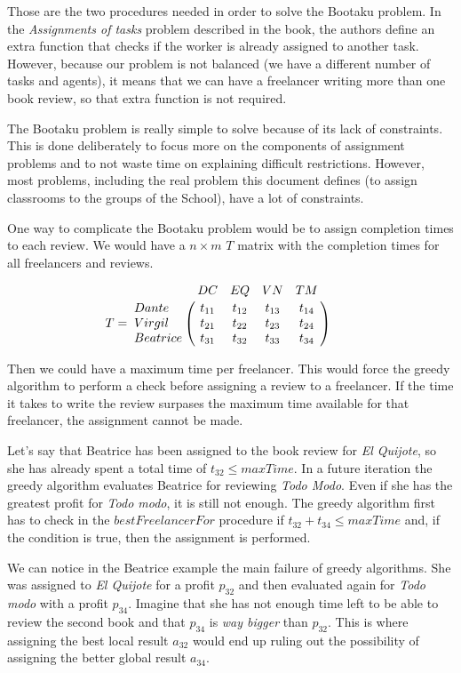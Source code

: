 Those are the two procedures needed in order to solve the Bootaku problem. In the \textit{Assignments of tasks} problem described in the book, the authors define an extra function that checks if the worker is already assigned to another task. However, because our problem is not balanced (we have a different number of tasks and agents), it means that we can have a freelancer writing more than one book review, so that extra function is not required.

The Bootaku problem is really simple to solve because of its lack of constraints. This is done deliberately to focus more on the components of assignment problems and to not waste time on explaining difficult restrictions. However, most problems, including the real problem this document defines (to assign classrooms to the groups of the School), have a lot of constraints. 

One way to complicate the Bootaku problem would be to assign completion times to each review. We would have a $n \times m$ $T$ matrix with the completion times for all freelancers and reviews.

\begin{equation}
    T = \bordermatrix{
        & DC & EQ & VN & TM \cr
        Dante & t_{11} & t_{12} & t_{13} & t_{14} \cr
        Virgil & t_{21} & t_{22} & t_{23} & t_{24} \cr
        Beatrice & t_{31} & t_{32} & t_{33} & t_{34} 
    } \qquad
\end{equation}

Then we could have a maximum time per freelancer. This would force the greedy algorithm to perform a check before assigning a review to a freelancer. If the time it takes to write the review surpases the maximum time available for that freelancer, the assignment cannot be made. 

Let's say that Beatrice has been assigned to the book review for \textit{El Quijote}, so she has already spent a total time of $t_{32} \leq maxTime$. In a future iteration the greedy algorithm evaluates Beatrice for reviewing \textit{Todo Modo}. Even if she has the greatest profit for \textit{Todo modo}, it is still not enough. The greedy algorithm first has to check in the $bestFreelancerFor$ procedure if $t_{32} + t_{34} \leq maxTime$ and, if the condition is true, then the assignment is performed. 

We can notice in the Beatrice example the main failure of greedy algorithms. She was assigned to \textit{El Quijote} for a profit $p_{32}$ and then evaluated again for \textit{Todo modo} with a profit $p_{34}$. Imagine that she has not enough time left to be able to review the second book and that $p_{34}$ is \textit{way bigger} than $p_{32}$. This is where assigning the best local result $a_{32}$ would end up ruling out the possibility of assigning the better global result $a_{34}$.




